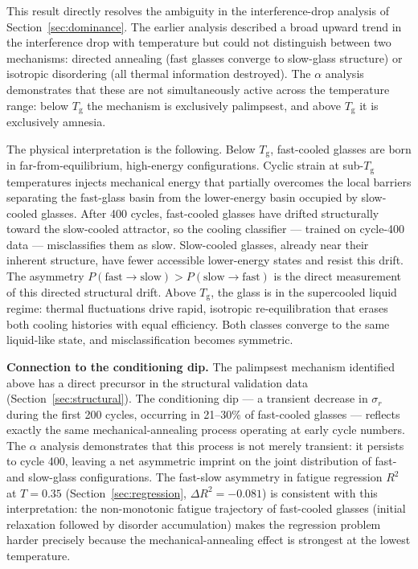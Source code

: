 \documentclass[12pt,a4paper]{article}
\newcommand{\Tg}{T_{\mathrm{g}}}
\newcommand{\sigr}{\sigma_r}
\begin{document}
This result directly resolves the ambiguity in the interference-drop analysis of Section~\ref{sec:dominance}.
The earlier analysis described a broad upward trend in the interference drop with temperature but could not distinguish between two mechanisms: directed annealing (fast glasses converge to slow-glass structure) or isotropic disordering (all thermal information destroyed).
The $\alpha$ analysis demonstrates that these are not simultaneously active across the temperature range: below $\Tg$ the mechanism is exclusively palimpsest, and above $\Tg$ it is exclusively amnesia.
 
The physical interpretation is the following.
Below $\Tg$, fast-cooled glasses are born in far-from-equilibrium, high-energy configurations.
Cyclic strain at sub-$\Tg$ temperatures injects mechanical energy that partially overcomes the local barriers separating the fast-glass basin from the lower-energy basin occupied by slow-cooled glasses.
After 400 cycles, fast-cooled glasses have drifted structurally toward the slow-cooled attractor, so the cooling classifier --- trained on cycle-400 data --- misclassifies them as slow.
Slow-cooled glasses, already near their inherent structure, have fewer accessible lower-energy states and resist this drift.
The asymmetry $P(\text{fast}\to\text{slow}) > P(\text{slow}\to\text{fast})$ is the direct measurement of this directed structural drift.
Above $\Tg$, the glass is in the supercooled liquid regime: thermal fluctuations drive rapid, isotropic re-equilibration that erases both cooling histories with equal efficiency.
Both classes converge to the same liquid-like state, and misclassification becomes symmetric.
 
\textbf{Connection to the conditioning dip.}
The palimpsest mechanism identified above has a direct precursor in the structural validation data (Section~\ref{sec:structural}).
The conditioning dip --- a transient decrease in $\sigr$ during the first 200 cycles, occurring in 21--30\% of fast-cooled glasses --- reflects exactly the same mechanical-annealing process operating at early cycle numbers.
The $\alpha$ analysis demonstrates that this process is not merely transient: it persists to cycle 400, leaving a net asymmetric imprint on the joint distribution of fast- and slow-glass configurations.
The fast-slow asymmetry in fatigue regression $R^2$ at $T = 0.35$ (Section~\ref{sec:regression}, $\Delta R^2 = -0.081$) is consistent with this interpretation: the non-monotonic fatigue trajectory of fast-cooled glasses (initial relaxation followed by disorder accumulation) makes the regression problem harder precisely because the mechanical-annealing effect is strongest at the lowest temperature.
 
\end{document}

